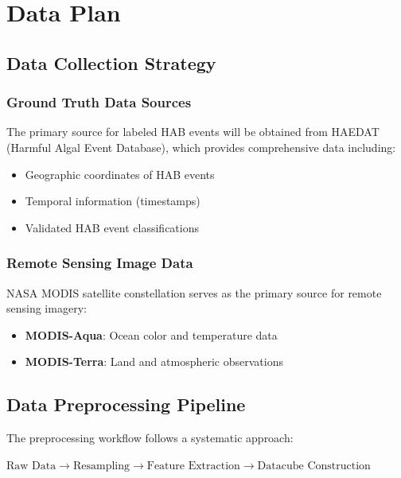 \documentclass[12pt]{article}
\begin{document}
\section{Data Plan}
\subsection{Data Collection Strategy}

\subsubsection{Ground Truth Data Sources}
The primary source for labeled HAB events will be obtained from HAEDAT (Harmful Algal Event Database), which provides comprehensive data including:
\begin{itemize}
    \item Geographic coordinates of HAB events
    \item Temporal information (timestamps)
    \item Validated HAB event classifications
\end{itemize}

\subsubsection{Remote Sensing Image Data}
NASA MODIS satellite constellation serves as the primary source for remote sensing imagery:
\begin{itemize}
    \item \textbf{MODIS-Aqua}: Ocean color and temperature data
    \item \textbf{MODIS-Terra}: Land and atmospheric observations
\end{itemize}

\subsection{Data Preprocessing Pipeline}

The preprocessing workflow follows a systematic approach:

\qquad $\text{Raw Data} \rightarrow \text{Resampling} \rightarrow \text{Feature Extraction} \rightarrow \text{Datacube Construction}$
\end{document}
